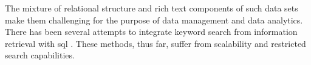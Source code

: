 		The mixture of relational structure and rich text components of such data sets make them challenging for the purpose of data management and data analytics.  There has been several attempts to integrate keyword search from information retrieval with \gls{sql} \cite{banks-02, fuzzy-11, ir-03}.  These methods, thus far, suffer from scalability and restricted search capabilities.
